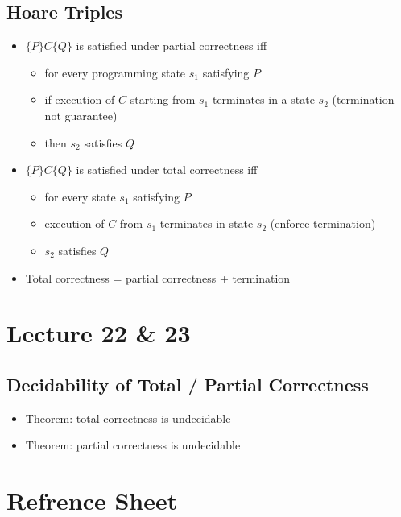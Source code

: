 \documentclass[11pt]{article}
\begin{document}
\subsection{Hoare Triples}
\begin{itemize}
    \item $\{P\}C\{Q\}$ is satisfied under partial correctness iff 
    \begin{itemize}
        \item for every programming state $s_1$ satisfying $P$
        \item if execution of $C$ starting from $s_1$ terminates in a state $s_2$ (termination not guarantee)
        \item then $s_2$ satisfies $Q$
    \end{itemize}
    \item $\{P\}C\{Q\}$ is satisfied under total correctness iff
    \begin{itemize}
        \item for every state $s_1$ satisfying $P$
        \item execution of $C$ from $s_1$ terminates in state $s_2$ (enforce termination)
        \item $s_2$ satisfies $Q$
    \end{itemize}
    \item Total correctness = partial correctness + termination 
\end{itemize}

\section{Lecture 22 \& 23}
\subsection{Decidability of Total / Partial Correctness}
\begin{itemize}
    \item Theorem: total correctness is undecidable 
    \item Theorem: partial correctness is undecidable
\end{itemize}

\section{Refrence Sheet}

\end{document}
